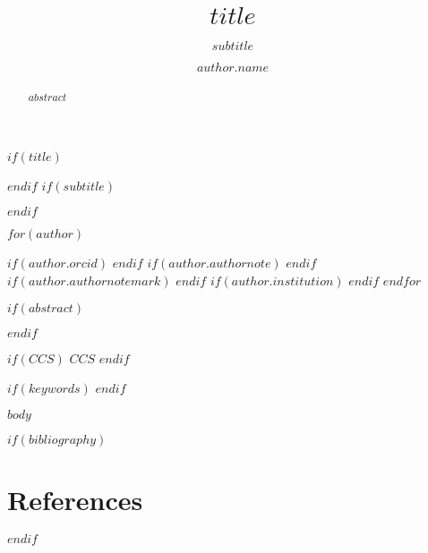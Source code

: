 \documentclass[manuscript,screen,review,anonymous]{acmart}
\begin{document}

$if(title)$
  \title{$title$}
$endif$
$if(subtitle)$
  \subtitle{$subtitle$}
$endif$

$for(author)$
\author{$author.name$}
$if(author.orcid)$
$endif$
$if(author.authornote)$
$endif$
$if(author.authornotemark)$
$endif$
$if(author.institution)$
$endif$
$endfor$

$if(abstract)$
\begin{abstract}
$abstract$
\end{abstract}
$endif$

\renewcommand{\shortauthors}{$shortauthors$}

\maketitle

$if(CCS)$
$CCS$
$endif$

$if(keywords)$
$endif$

$body$

$if(bibliography)$
  \section{References}
  \balance
  
  
$endif$
\end{document}
